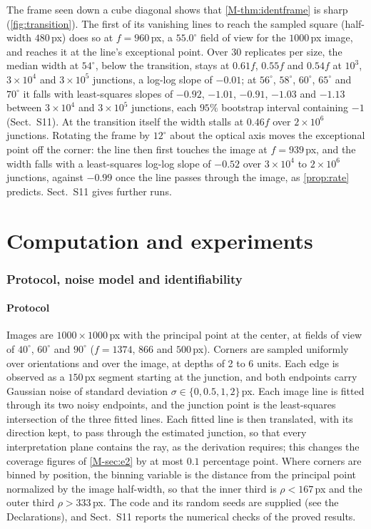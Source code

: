 The frame seen down a cube diagonal shows that \cref{M-thm:identframe} is sharp (\cref{fig:transition}). The first of its vanishing lines to reach the sampled square (half-width $480$\,px) does so at $f=960$\,px, a $55.0^\circ$ field of view for the $1000$\,px image, and reaches it at the line's exceptional point. Over $30$ replicates per size, the median width at $54^\circ$, below the transition, stays at $0.61f$, $0.55f$ and $0.54f$ at $10^3$, $3\times10^4$ and $3\times10^5$ junctions, a log-log slope of $-0.01$; at $56^\circ$, $58^\circ$, $60^\circ$, $65^\circ$ and $70^\circ$ it falls with least-squares slopes of $-0.92$, $-1.01$, $-0.91$, $-1.03$ and $-1.13$ between $3\times10^4$ and $3\times10^5$ junctions, each $95\%$ bootstrap interval containing $-1$ (Sect.~S11). At the transition itself the width stalls at $0.46f$ over $2\times10^{6}$ junctions. Rotating the frame by $12^\circ$ about the optical axis moves the exceptional point off the corner: the line then first touches the image at $f=939$\,px, and the width falls with a least-squares log-log slope of $-0.52$ over $3\times10^{4}$ to $2\times10^{6}$ junctions, against $-0.99$ once the line passes through the image, as \cref{prop:rate} predicts. Sect.~S11 gives further runs.

\part{Computation and experiments}

\section{Protocol, noise model and identifiability}\label{sec:Sprotocol}

\subsection{Protocol}

Images are $1000\times1000$\,px with the principal point at the center, at fields of view of $40^\circ$, $60^\circ$ and $90^\circ$ ($f=1374$, $866$ and $500$\,px). Corners are sampled uniformly over orientations and over the image, at depths of 2 to 6 units. Each edge is observed as a $150$\,px segment starting at the junction, and both endpoints carry Gaussian noise of standard deviation $\sigma\in\{0,0.5,1,2\}$\,px. Each image line is fitted through its two noisy endpoints, and the junction point is the least-squares intersection of the three fitted lines. Each fitted line is then translated, with its direction kept, to pass through the estimated junction, so that every interpretation plane contains the ray, as the derivation requires; this changes the coverage figures of \cref{M-sec:e2} by at most $0.1$ percentage point. Where corners are binned by position, the binning variable is the distance from the principal point normalized by the image half-width, so that the inner third is $\rho<167$\,px and the outer third $\rho>333$\,px. The code and its random seeds are supplied (see the Declarations), and Sect.~S11 reports the numerical checks of the proved results.

